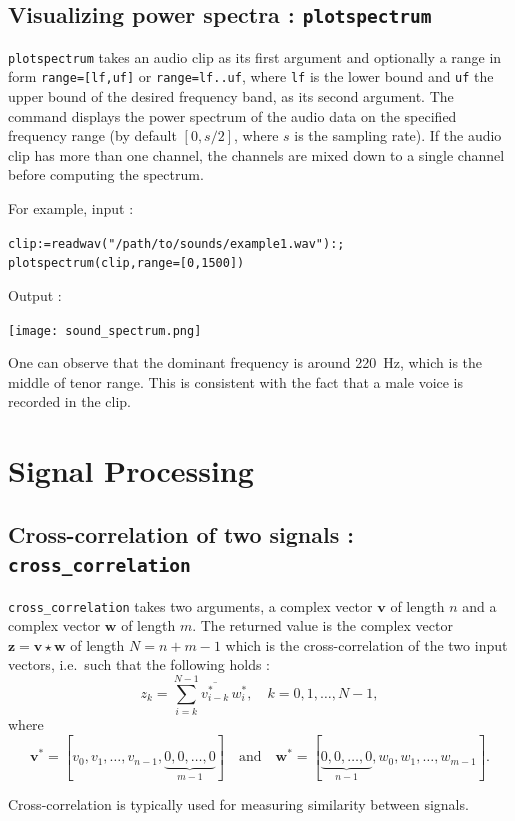 \documentclass[a4paper,11pt]{book}
\begin{document}
\subsection{Visualizing power spectra : {\tt plotspectrum}}
{\tt plotspectrum} takes an audio clip as its first argument and optionally a range in form {\tt range=[lf,uf]} or {\tt range=lf..uf}, where {\tt lf} is the lower bound and {\tt uf} the upper bound of the desired frequency band, as its second argument. The command displays the power spectrum of the audio data on the specified frequency range (by default $[0,s/2]$, where $s$ is the sampling rate). If the audio clip has more than one channel, the channels are mixed down to a single channel before computing the spectrum.

For example, input :
\begin{center}
  \tt clip:=readwav("/path/to/sounds/example1.wav"):;\\
  plotspectrum(clip,range=[0,1500])
\end{center}
Output :
\begin{center}
  \texttt{[image: sound\_spectrum.png]}
\end{center}
One can observe that the dominant frequency is around 220~Hz, which is the middle of tenor range. This is consistent with the fact that a male voice is recorded in the clip.

\section{Signal Processing}
\subsection{Cross-correlation of two signals : {\tt cross\_correlation}}
\label{sec:crosscorr}
{\tt cross\_correlation} takes two arguments, a complex vector $ \mathbf{v} $ of length $ n $ and a complex vector $ \mathbf{w} $ of length $ m $. The returned value is the complex vector $ \mathbf{z}=\mathbf{v}\star\mathbf{w} $ of length $ N=n+m-1 $ which is the cross-correlation of the two input vectors, i.e.~such that the following holds :
\[ z_k=\sum_{i=k}^{N-1}\overline{v_{i-k}^\ast}\,w_i^\ast,\quad k=0,1,\dots,N-1, \]
where
\[ \mathbf{v}^\ast=[v_0,v_1,\dots,v_{n-1},\underbrace{0,0,\dots,0}_{m-1}]\quad\text{and}\quad\mathbf{w}^\ast=[\underbrace{0,0,\dots,0}_{n-1},w_0,w_1,\dots,w_{m-1}]. \]

Cross-correlation is typically used for measuring similarity between signals.
\end{document}
